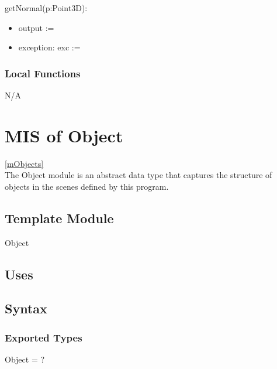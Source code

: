 \documentclass[12pt, titlepage]{article}
\begin{document}
\noindent getNormal(p:Point3D):
\begin{itemize}
	\item output := 
	\item exception: exc :=
\end{itemize}


\subsubsection{Local Functions}
N/A

\newpage

\section{MIS of Object} \ref{mObjects} \\
The Object module is an abstract data type that captures the structure of 
objects in the scenes defined by this program.

\subsection{Template Module}
Object

\subsection{Uses}

\subsection{Syntax}
\subsubsection{Exported Types}
Object = ?
\end{document}
